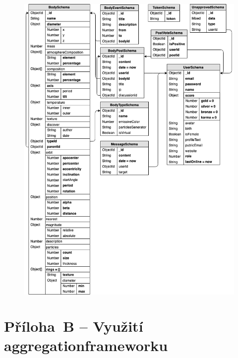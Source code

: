 \documentclass[a4paper,12pt]{article}
\begin{document}
\begin{figure}[H]
\vspace{-0.5cm}\hspace{-1cm}
\includegraphics[width=450pt]{Images/DB.png}
\end{figure}

\clearpage {}\label{prilohaB} 

\section*{Příloha~B --  Využití aggregation\newline frameworku}



\clearpage {}\label{prilohaC} 
\end{document}
